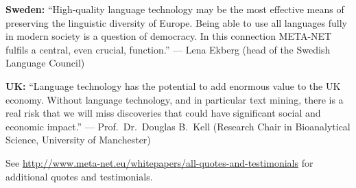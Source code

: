 \documentclass[10pt, plain]{../../metanetpaper}
\begin{document}
\bigskip \textbf{Sweden:} ``High-quality language technology may be the most effective means of preserving the linguistic diversity of Europe. Being able to use all languages fully in modern society is a question of democracy. In this connection META-NET fulfils a central, even crucial, function.'' --- Lena Ekberg (head of the Swedish Language Council)

\bigskip \textbf{UK:} ``Language technology has the potential to add enormous value to the UK economy. Without language technology, and in particular text mining, there is a real risk that we will miss discoveries that could have significant social and economic impact.'' --- Prof.~Dr.~Douglas B.~Kell (Research Chair in Bioanalytical Science, University of Manchester)

\bigskip \centerline{See \url{http://www.meta-net.eu/whitepapers/all-quotes-and-testimonials} for additional quotes and testimonials.}

\clearpage



\renewcommand\contentsname{}
\tableofcontents


\clearpage


\setcounter{page}{1}
\pagestyle{scrheadings}

\clearpage

%
\end{document}
